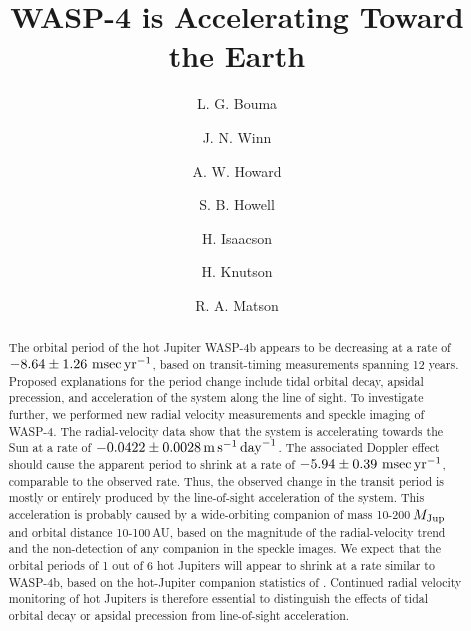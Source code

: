 \documentclass[12pt,twocolumn,tighten]{aastex62}
\begin{document}

\title{WASP-4 is Accelerating Toward the Earth}


%
%
\author[0000-0002-0514-5538]{L. G. Bouma}
%
\author[0000-0002-4265-047X]{J. N. Winn}

%
%
\author[0000-0001-8638-0320]{A. W. Howard}
%
\author{S. B. Howell}
%
\author[0000-0002-0531-1073]{H. Isaacson}
%
\author{H. Knutson}
%
\author[0000-0001-7233-7508]{R. A. Matson}
%

\begin{abstract}
  The orbital period of the hot Jupiter WASP-4b appears to be
  decreasing at a rate of $-8.64 \pm 1.26~{\rm msec}\,{\rm yr}^{-1}$,
  based on transit-timing measurements spanning 12 years.  Proposed
  explanations for the period change include tidal orbital decay,
  apsidal precession, and acceleration of the system along the line of
  sight.  To investigate further, we performed new radial velocity
  measurements and speckle imaging of WASP-4.  The radial-velocity
  data show that the system is accelerating towards the Sun at a rate
  of $-0.0422\pm 0.0028\,{\rm m}\,{\rm s}^{-1}\,{\rm day}^{-1}$.  The
  associated Doppler effect should cause the apparent period to shrink
  at a rate of $-5.94 \pm 0.39~{\rm msec}\,{\rm yr}^{-1}$, comparable
  to the observed rate.  Thus, the observed change in the transit
  period is mostly or entirely produced by the line-of-sight
  acceleration of the system.  This acceleration is probably caused by
  a wide-orbiting companion of mass 10-200$\,M_{\rm Jup}$ and orbital
  distance 10-100$\,$AU, based on the magnitude of the radial-velocity
  trend and the non-detection of any companion in the speckle images.
  We expect that the orbital periods of 1 out of 6 hot Jupiters will
  appear to shrink at a rate similar to WASP-4b, based on the
  hot-Jupiter companion statistics of \citet{knutson_friends_2014}.
  Continued radial velocity monitoring of hot Jupiters is therefore
  essential to distinguish the effects of tidal orbital decay or
  apsidal precession from line-of-sight acceleration.
\end{abstract}
\end{document}
